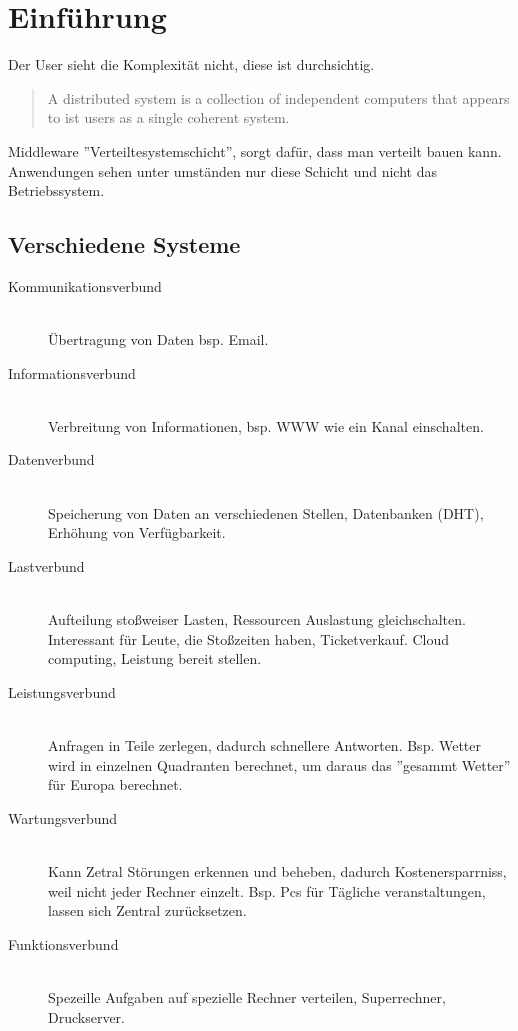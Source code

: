 \chapter{Einführung}

\begin{stddef} [Transparenz]
	Der User sieht die Komplexität nicht, diese ist durchsichtig.
\end{stddef}

\begin{quote}
	A distributed system is a collection of independent computers that appears to ist users as a single coherent system.
\end{quote}

Middleware ''Verteiltesystemschicht'', sorgt dafür, dass man verteilt bauen kann. Anwendungen sehen unter umständen nur diese Schicht und nicht das Betriebssystem.

\section{Verschiedene Systeme}
\begin{description}
	\item[Kommunikationsverbund] \hfill \\
		Übertragung von Daten bsp. Email.
	\item[Informationsverbund] \hfill \\
		Verbreitung von Informationen, bsp. WWW wie ein Kanal einschalten.
	\item[Datenverbund] \hfill \\
		Speicherung von Daten an verschiedenen Stellen, Datenbanken (DHT), Erhöhung von Verfügbarkeit.
	\item[Lastverbund] \hfill \\
		Aufteilung stoßweiser Lasten, Ressourcen Auslastung gleichschalten. Interessant für Leute, die Stoßzeiten haben, Ticketverkauf. Cloud computing, Leistung bereit stellen.
	\item[Leistungsverbund] \hfill \\
		Anfragen in Teile zerlegen, dadurch schnellere Antworten. Bsp. Wetter wird in einzelnen Quadranten berechnet, um daraus das ''gesammt Wetter'' für Europa berechnet.
	\item[Wartungsverbund] \hfill \\
		Kann Zetral Störungen erkennen und beheben, dadurch Kostenersparrniss, weil nicht jeder Rechner einzelt. Bsp. Pcs für Tägliche veranstaltungen, lassen sich Zentral zurücksetzen.
	\item[Funktionsverbund] \hfill \\
		Spezeille Aufgaben auf spezielle Rechner verteilen, Superrechner, Druckserver.
\end{description}


